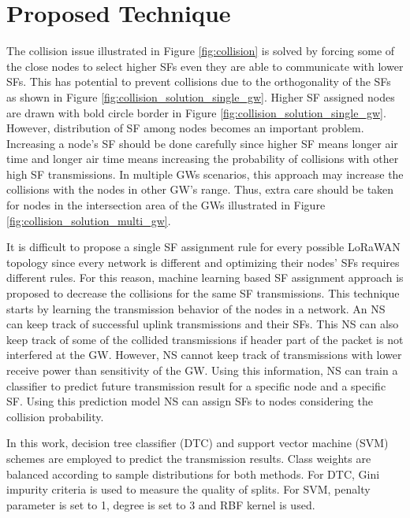 \documentclass[conference]{IEEEtran}
\begin{document}
\section{Proposed Technique} \label{Proposed Technique}
\par The collision issue illustrated in Figure \ref{fig:collision} is solved by forcing some of the close nodes to select higher SFs even they are able to communicate with lower SFs. This has potential to prevent collisions due to the orthogonality of the SFs as shown in Figure \ref{fig:collision_solution_single_gw}. Higher SF assigned nodes are drawn with bold circle border in Figure \ref{fig:collision_solution_single_gw}. However, distribution of SF among nodes becomes an important problem. Increasing a node's SF should be done carefully since higher SF means longer air time and longer air time means increasing the probability of collisions with other high SF transmissions. In multiple GWs scenarios, this approach may increase the collisions with the nodes in other GW's range. Thus, extra care should be taken for nodes in the intersection area of the GWs illustrated in Figure \ref{fig:collision_solution_multi_gw}.

\par It is difficult to propose a single SF assignment rule for every possible LoRaWAN topology since every network is different and optimizing their nodes' SFs requires different rules. For this reason, machine learning based SF assignment approach is proposed to decrease the collisions for the same SF transmissions. This technique starts by learning the transmission behavior of the nodes in a network. An NS can keep track of successful uplink transmissions and their SFs. This NS can also keep track of some of the collided transmissions if header part of the packet is not interfered at the GW. However, NS cannot keep track of transmissions with lower receive power than sensitivity of the GW. Using this information, NS can train a classifier to predict future transmission result for a specific node and a specific SF. Using this prediction model NS can assign SFs to nodes considering the collision probability.

\par In this work, decision tree classifier (DTC) and support vector machine (SVM) \cite{Alpaydin} schemes are employed to predict the transmission results. Class weights are balanced according to sample distributions for both methods. For DTC, Gini impurity criteria is used to measure the quality of splits. For SVM, penalty parameter is set to 1, degree is set to 3 and RBF kernel is used.
\end{document}
